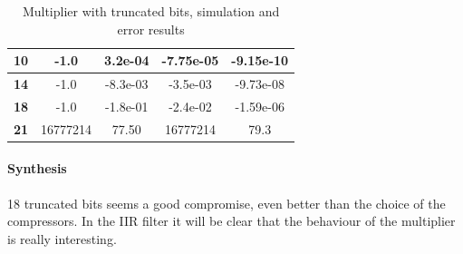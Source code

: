 \documentclass[a4paper]{article}
\begin{document}
\begin{table}[hbtp]
\begin{tabular}{|c|c|c|c|c|}
		\textbf{10}                                                                  & 		-1.0                                                                            & 		3.2e-04                                                                          & 		-7.75e-05                                                                      & 		-9.15e-10                                                                       \\ \hline
		\textbf{14}                                                                  & 		-1.0                                                                            & 		-8.3e-03                                                                         & 		-3.5e-03                                                                       & 		-9.73e-08                                                                       \\ \hline
		\textbf{18}                                                                  & 		-1.0                                                                            & 		-1.8e-01                                                                         & 		-2.4e-02                                                                       & 		-1.59e-06                                                                       \\ \hline
		\textbf{21}                                                                  & 		16777214                                                                        & 		77.50                                                                            & 		16777214                                                                       & 		79.3                                                                            \\ \hline
		\end{tabular}
		\caption{Multiplier with truncated bits, simulation and error results}
		\label{tab:mult_trunc_sim}
	\end{table}

	\paragraph*{Synthesis} 18 truncated bits seems a good compromise, even better than the choice of the compressors. In the IIR filter it will be clear that the behaviour of the multiplier is really interesting.
\end{document}
